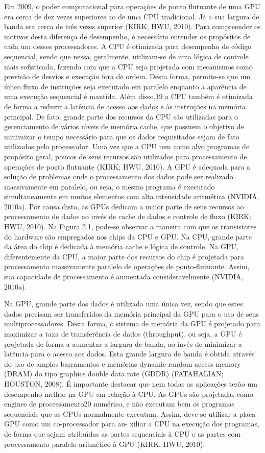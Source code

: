 Em 2009, o poder computacional para operações de ponto flutuante de uma GPU
era cerca de dez vezes superiores ao de uma CPU tradicional. Já a sua largura de
banda era cerca de três vezes superior (KIRK; HWU, 2010). Para compreender os
motivos desta diferença de desempenho, é necessário entender os propósitos de cada
um desses processadores.
A CPU é otimizada para desempenho de código sequencial, sendo que nessa,
geralmente, utilizam-se de uma lógica de controle mais sofisticada, fazendo com que
a CPU seja projetada com mecanismos como previsão de desvios e execução fora de
ordem. Desta forma, permite-se que um único fluxo de instruções seja executado em
paralelo enquanto a aparência de uma execução sequencial é mantida. Além disso,19
a CPU também é otimizada de forma a reduzir a latência de acesso aos dados e às
instruções na memória principal. De fato, grande parte dos recursos da CPU são
utilizadas para o gerenciamento de vários nı́veis de memória cache, que possuem o
objetivo de minimizar o tempo necessário para que os dados requisitados sejam de
fato utilizados pelo processador. Uma vez que a CPU tem como alvo programas
de propósito geral, poucos de seus recursos são utilizados para processamento de
operações de ponto flutuante (KIRK; HWU, 2010).
A GPU é adequada para a solução de problemas onde o processamento dos
dados pode ser realizado massivamente em paralelo, ou seja, o mesmo programa
é executado simultaneamente em muitos elementos com alta intensidade aritmética
(NVIDIA, 2010a). Por causa disto, as GPUs dedicam a maior parte de seus recursos
ao processamento de dados ao invés de cache de dados e controle de fluxo (KIRK;
HWU, 2010).
Na Figura 2.1, pode-se observar a maneira com que os transistores do hardware
são empregados nos chips da CPU e GPU. Na CPU, grande parte da área do chip é
dedicada à memória cache e lógica de controle. Na GPU, diferentemente da CPU,
a maior parte dos recursos do chip é projetada para processamento massivamente
paralelo de operações de ponto-flutuante. Assim, sua capacidade de processamento
é aumentada consideravelmente (NVIDIA, 2010a).

Na GPU, grande parte dos dados é utilizada uma única vez, sendo que estes
dados precisam ser transferidos da memória principal da GPU para o uso de seus
multiprocessadores. Desta forma, o sistema de memória da GPU é projetado para
maximizar a taxa de transferência de dados (throughput), ou seja, a GPU é projetada
de forma a aumentar a largura de banda, ao invés de minimizar a latência para o
acesso aos dados. Esta grande largura de banda é obtida através do uso de amplos
barramentos e memórias dynamic random access memory (DRAM) do tipo graphics
double data rate (GDDR) (FATAHALIAN; HOUSTON, 2008).
É importante destacar que nem todas as aplicações terão um desempenho melhor
na GPU em relação à CPU. As GPUs são projetadas como engines de processamento20
numérico, e não executam bem os programas sequenciais que as CPUs normalmente
executam. Assim, deve-se utilizar a placa GPU como um co-processador para au-
xiliar a CPU na execução dos programas, de forma que sejam atribuı́das as partes
sequenciais à CPU e as partes com processamento paralelo aritmético à GPU (KIRK;
HWU, 2010).

